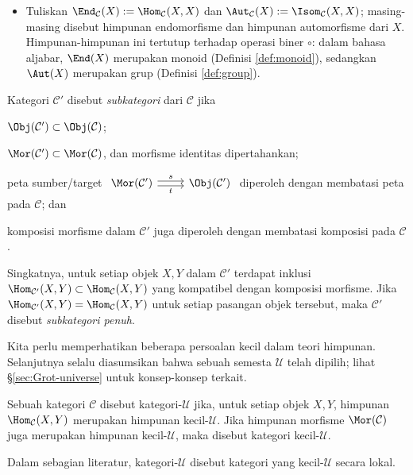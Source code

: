 \begin{itemize}
	\item Tuliskan $\End_{\mathcal{C}}(X) := \Hom_{\mathcal{C}}(X, X)$ dan $\Aut_{\mathcal{C}}(X) := \Isom_{\mathcal{C}}(X, X)$; masing-masing disebut himpunan endomorfisme dan himpunan automorfisme dari $X$. Himpunan-himpunan ini tertutup terhadap operasi biner $\circ$: dalam bahasa aljabar, $\End(X)$ merupakan monoid (Definisi \ref{def:monoid}), sedangkan $\Aut(X)$ merupakan grup (Definisi \ref{def:group}).
\end{itemize}

\begin{definition}\label{def:subcategory}
	Kategori $\mathcal{C}'$ disebut \emph{subkategori} dari $\mathcal{C}$ jika
	\begin{compactenum}[(i)]
		\item $\Obj(\mathcal{C}') \subset \Obj(\mathcal{C})$;
		\item $\Mor(\mathcal{C}') \subset \Mor(\mathcal{C})$, dan morfisme identitas dipertahankan;
		\item peta sumber/target $\begin{tikzcd} \Mor(\mathcal{C}') \arrow[yshift=-0.5ex, r, "t"'] \arrow[yshift=0.5ex, r, "s"] & \Obj(\mathcal{C}') \end{tikzcd}$ diperoleh dengan membatasi peta pada $\mathcal{C}$; dan
		\item komposisi morfisme dalam $\mathcal{C}'$ juga diperoleh dengan membatasi komposisi pada $\mathcal{C}$.
	\end{compactenum}

	Singkatnya, untuk setiap objek $X,Y$ dalam $\mathcal{C}'$ terdapat inklusi $\Hom_{\mathcal{C}'}(X, Y) \subset \Hom_{\mathcal{C}}(X, Y)$ yang kompatibel dengan komposisi morfisme. Jika $\Hom_{\mathcal{C}'}(X, Y) = \Hom_{\mathcal{C}}(X, Y)$ untuk setiap pasangan objek tersebut, maka $\mathcal{C}'$ disebut \emph{subkategori penuh}.
\end{definition}

Kita perlu memperhatikan beberapa persoalan kecil dalam teori himpunan. Selanjutnya selalu diasumsikan bahwa sebuah semesta $\mathcal{U}$ telah dipilih; lihat \S\ref{sec:Grot-universe} untuk konsep-konsep terkait.

\begin{definition}\label{def:U-cat}
  Sebuah kategori $\mathcal{C}$ disebut kategori-$\mathcal{U}$ jika, untuk setiap objek $X,Y$, himpunan $\Hom_{\mathcal{C}}(X,Y)$ merupakan himpunan kecil-$\mathcal{U}$. Jika himpunan morfisme $\Mor(\mathcal{C})$ juga merupakan himpunan kecil-$\mathcal{U}$, maka disebut kategori kecil-$\mathcal{U}$.
\end{definition}
Dalam sebagian literatur, kategori-$\mathcal{U}$ disebut kategori yang kecil-$\mathcal{U}$ secara lokal.

